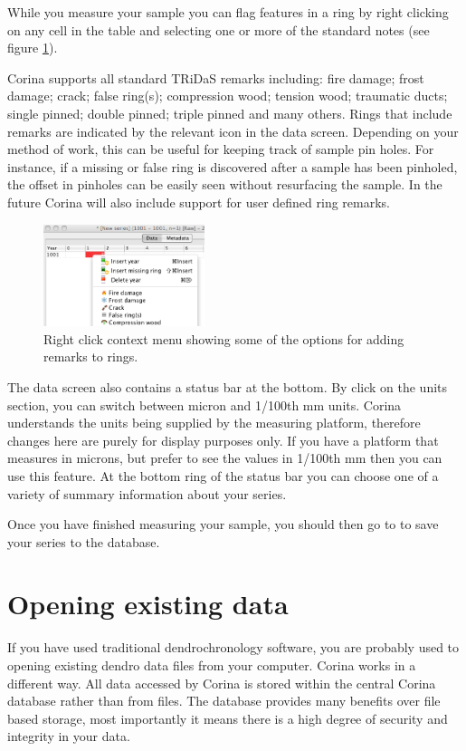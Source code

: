 While you measure your sample you can flag features in a ring by right clicking on any cell in the table and selecting one or more of the standard notes (see figure \ref{fig:ringremarks}).

Corina supports all standard TRiDaS remarks including: fire damage; frost damage; crack; false ring(s); compression wood; tension wood; traumatic ducts; single pinned; double pinned; triple pinned and many others.  Rings that include remarks are indicated by the relevant icon in the data screen.  Depending on your method of work, this can be useful for keeping track of sample pin holes.  For instance, if a missing or false ring is discovered after a sample has been pinholed, the offset in pinholes can be easily seen without resurfacing the sample.  In the future Corina will also include support for user defined ring remarks.  

\begin{figure}
  \begin{center}
    \includegraphics[width=0.42\textwidth]{Images/ringremarks.png}
  \end{center}
  \caption{Right click context menu showing some of the options for adding remarks to rings.}
  \label{fig:ringremarks}
\end{figure}

The data screen also contains a status bar at the bottom. By click on the units section, you can switch between micron and 1/100th mm units. Corina understands the units being supplied by the measuring platform, therefore changes here are purely for display purposes only. If you have a platform that measures in microns, but prefer to see the values in 1/100th mm then you can use this feature. At the bottom ring of the status bar you can choose one of a variety of summary information about your series.

Once you have finished measuring your sample, you should then go to  to save your series to the database. 


\section{Opening existing data}
If you have used traditional dendrochronology software, you are probably used to opening existing dendro data files from your computer.  Corina works in a different way.  All data accessed by Corina is stored within the central Corina database rather than from files.  The database provides many benefits over file based storage, most importantly it means there is a high degree of security and integrity in your data.  

